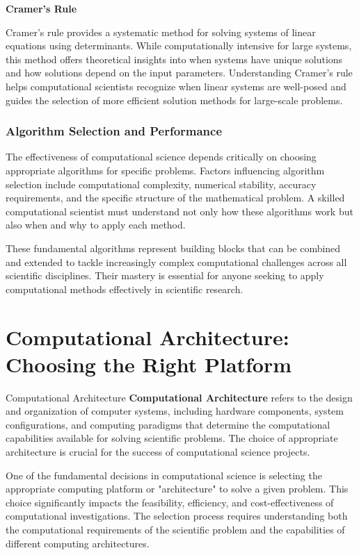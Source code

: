 \textbf{Cramer's Rule}

Cramer's rule provides a systematic method for solving systems of linear equations using determinants. While computationally intensive for large systems, this method offers theoretical insights into when systems have unique solutions and how solutions depend on the input parameters. Understanding Cramer's rule helps computational scientists recognize when linear systems are well-posed and guides the selection of more efficient solution methods for large-scale problems.

\subsubsection{Algorithm Selection and Performance}

The effectiveness of computational science depends critically on choosing appropriate algorithms for specific problems. Factors influencing algorithm selection include computational complexity, numerical stability, accuracy requirements, and the specific structure of the mathematical problem. A skilled computational scientist must understand not only how these algorithms work but also when and why to apply each method.

These fundamental algorithms represent building blocks that can be combined and extended to tackle increasingly complex computational challenges across all scientific disciplines. Their mastery is essential for anyone seeking to apply computational methods effectively in scientific research.

\section{Computational Architecture: Choosing the Right Platform}

\begin{conceptcard}{Computational Architecture}
\textbf{Computational Architecture} refers to the design and organization of computer systems, including hardware components, system configurations, and computing paradigms that determine the computational capabilities available for solving scientific problems. The choice of appropriate architecture is crucial for the success of computational science projects.
\end{conceptcard}

One of the fundamental decisions in computational science is selecting the appropriate computing platform or "architecture" to solve a given problem. This choice significantly impacts the feasibility, efficiency, and cost-effectiveness of computational investigations. The selection process requires understanding both the computational requirements of the scientific problem and the capabilities of different computing architectures.

